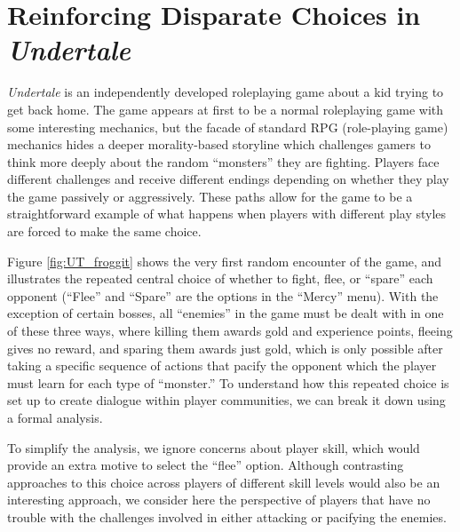 \documentclass[arts,article,accept,moreauthors,pdftex,10pt,a4paper]{Definitions/mdpi}
\begin{document}
\section{Reinforcing Disparate Choices in \emph{Undertale}}

\emph{Undertale} is an independently developed roleplaying game \citep{fox2015undertale} about a kid trying to get back home.
%
The game appears at first to be a normal roleplaying game with some interesting mechanics, but the facade of standard RPG (role-playing game) mechanics hides a deeper morality-based storyline which challenges gamers to think more deeply about the random ``monsters'' they are fighting. %
%
Players face different challenges and receive different endings depending on whether they play the game passively or aggressively.
%
These paths allow for the game to be a straightforward example of what happens when players with different play styles are forced to make the same choice.


Figure \ref{fig:UT_froggit} shows the very first random encounter of the game, and illustrates the repeated central choice of whether to fight, flee, or ``spare'' each opponent (``Flee'' and ``Spare'' are the options in the ``Mercy'' menu).
%
With the exception of certain bosses, all ``enemies'' in the game must be dealt with in one of these three ways, where killing them awards gold and experience points, fleeing gives no reward, and sparing them awards just gold, which is only possible after taking a specific sequence of actions that pacify the opponent which the player must learn for each type of ``monster.''
%
To understand how this repeated choice is set up to create dialogue within player communities, we can break it down using a formal analysis.



To simplify the analysis, we ignore concerns about player skill, which would provide an extra motive to select the ``flee'' option.
%
Although contrasting approaches to this choice across players of different skill levels would also be an interesting approach, we consider here the perspective of players that have no trouble with the challenges involved in either attacking or pacifying the enemies.
\end{document}
